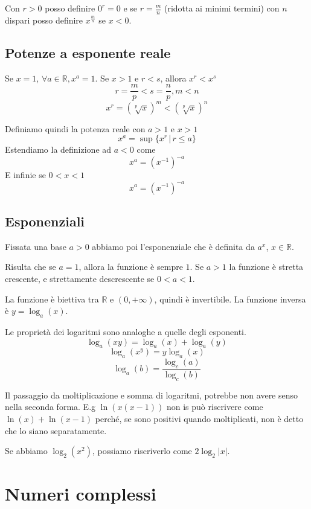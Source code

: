 \documentclass[a4paper]{article}
\begin{document}
Con \(r>0\) posso definire \(0^r = 0\)
e se \(r=\frac{m}{n}\) (ridotta ai minimi termini) con \(n\) dispari
posso definire \(x^\frac{m}{n}\) se \(x<0\).

\subsection{Potenze a esponente reale}

Se \(x=1\), \(\forall a\in \mathbb{R}, x^a = 1\).
Se \(x>1\) e \(r<s\), allora \(x^r < x^s\)
\[
    r = \frac{m}{p} < s = \frac{n}{p}, m < n
\]
\[
    x^r = {(\sqrt[p]{x})}^m < {(\sqrt[p]{x})}^n
\]

Definiamo quindi la potenza reale con \(a>1\) e \(x>1\)
\[
    x^a = \sup \{ x^r \,|\, r \leq a \}
\]
Estendiamo la definizione ad \(a < 0\) come
\[
    x^a = {(x^{-1})}^{-a}
\]
E infinie se \(0<x<1\)
\[
    x^a = {(x^{-1})}^{-a}
\]

\pagebreak

\subsection{Esponenziali}

Fissata una base \(a>0\) abbiamo poi l'esponenziale che è definita da \(a^x\),
\(x\in\mathbb{R}\).

Risulta che se \(a=1\), allora la funzione è sempre \(1\).
Se \(a>1\) la funzione è stretta crescente, e strettamente descrescente se \(0<a<1\).

La funzione è biettiva tra \(\mathbb{R}\) e \((0, +\infty)\), quindi è invertibile.
La funzione inversa è \(y=\log_a(x)\).

Le proprietà dei logaritmi sono analoghe a quelle degli esponenti.
 {
    \[
        \log_a(xy) = \log_a(x) + \log_a(y)
    \]
    \[
        \log_a(x^y) = y\log_a(x)
    \]
    \[
        \log_a(b) = \frac{\log_c(a)}{\log_c(b)}
    \]
}



Il passaggio da moltiplicazione e somma di logaritmi, potrebbe non avere senso
nella seconda forma.
E.g \(\ln(x(x-1))\) non is può riscrivere come \(\ln(x) + \ln(x-1)\)
perché, se sono positivi quando moltiplicati, non è detto che lo siano separatamente.

Se abbiamo \(\log_2(x^2)\), possiamo riscriverlo come \(2 \log_2|x|\).

\pagebreak

\section{Numeri complessi}
\end{document}
